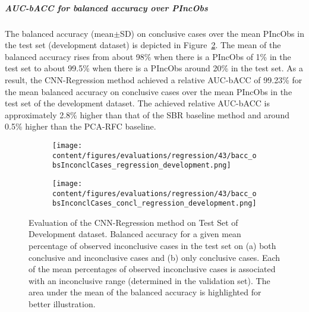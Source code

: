 \subparagraph{AUC-bACC for balanced accuracy over PIncObs}

The balanced accuracy (mean$\pm$SD) on conclusive cases over the mean PIncObs in the test set (development dataset) 
is depicted in Figure~\ref{fig:bacc_obsInconclCases_concl_regression_development}.
The mean of the balanced accuracy rises from about 98\% when there is a PIncObs of 1\% in the test set 
to about 99.5\% when there is a PIncObs around 20\% in the test set.
As a result, the CNN-Regression method achieved a relative AUC-bACC of 99.23\% for the mean balanced accuracy on conclusive cases
over the mean PIncObs in the test set of the development dataset.
The achieved relative AUC-bACC is approximately 2.8\% higher than that of the SBR baseline method 
and around 0.5\% higher than the PCA-RFC baseline.


\begin{figure}[ht]
  \begin{subfigure}{0.5\textwidth}
    \centering
    \texttt{[image: content/figures/evaluations/regression/43/bacc\_obsInconclCases\_regression\_development.png]}
    \subcaption{}
    \label{fig:bacc_obsInconclCases_regression_development}
  \end{subfigure}
  \hfill
  \begin{subfigure}{0.5\textwidth}
    \centering
    \texttt{[image: content/figures/evaluations/regression/43/bacc\_obsInconclCases\_concl\_regression\_development.png]}
    \subcaption{}
    \label{fig:bacc_obsInconclCases_concl_regression_development}
  \end{subfigure}

  \caption{Evaluation of the CNN-Regression method on Test Set of Development dataset.
  Balanced accuracy for a given mean percentage of observed inconclusive cases in the test set on 
  (a) both conclusive and inconclusive cases and (b) only conclusive cases. 
  Each of the mean percentages of observed inconclusive cases is associated with an inconclusive range (determined in the validation set). 
  The area under the mean of the balanced accuracy is highlighted for better illustration.}
  \label{fig:bacc_obsInconclCases_regression_development_full}
\end{figure}



